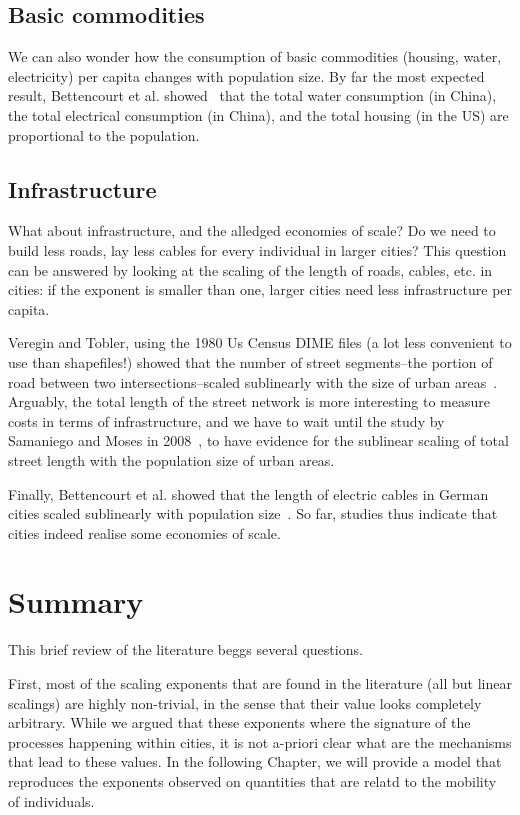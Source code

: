 \subsection{Basic commodities}
\label{sub:basic_commodities}

We can also wonder how the consumption of basic commodities (housing, water,
electricity) per capita changes with population size. By far the most expected
result, Bettencourt et al. showed~\cite{Bettencourt:2007} that the total water
consumption (in China), the total electrical consumption (in China),  and the
total housing (in the US) are proportional to the population.\\


\subsection{Infrastructure}
\label{sub:infrastructure}

What about infrastructure, and the alledged economies of scale? Do we need to build less
roads, lay less cables for every individual in larger cities? This question can
be answered by looking at the scaling of the length of roads, cables, etc. in
cities: if the exponent is smaller than one, larger cities need less
infrastructure per capita.

Veregin and Tobler, using the 1980 Us Census DIME files (a lot less convenient
to use than shapefiles!) showed that the number of street segments--the portion
of road between two intersections--scaled sublinearly with the size of urban
areas~\cite{Veregin:1997}. Arguably, the total length of the street network is
more interesting to measure costs in terms of infrastructure, and we have to
wait until the study by Samaniego and Moses in 2008~\cite{Samaniego:2008}, to
have evidence for the sublinear scaling of total street length with the
population size of urban areas. 

Finally, Bettencourt et al. showed that the length of electric cables in German
cities scaled sublinearly with population size~\cite{Bettencourt:2007}. So far,
studies thus indicate that cities indeed realise some economies of scale.

\section{Summary}
\label{sec:summary}


This brief review of the literature beggs several questions. 

First, most of the scaling exponents that are found in the literature (all but
linear scalings) are highly non-trivial, in the sense that their value looks
completely arbitrary. While we argued that these exponents where the signature
of the processes happening within cities, it is not a-priori clear what are the
mechanisms that lead to these values. In the following Chapter, we will provide
a model that reproduces the exponents observed on quantities that are relatd to
the mobility of individuals.

